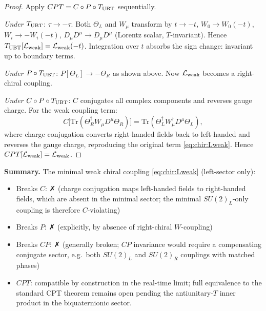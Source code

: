 \documentclass[12pt,a4paper]{article}
\theoremstyle{definition}
\theoremstyle{remark}
\begin{document}
\begin{proof}
Apply $CPT = C \circ P \circ T_{\rm UBT}$ sequentially.

\medskip
\noindent\textit{Under $T_{\rm UBT}$}: $\tau\to-\tau$.
Both $\Theta_L$ and $W_\mu$ transform by $t\to-t$,
$W_0\to W_0(-t)$, $W_i\to -W_i(-t)$, $D_\mu D^\mu \to D_\mu D^\mu$
(Lorentz scalar, $T$-invariant).
Hence $T_{\rm UBT}[\mathcal{L}_{\rm weak}] = \mathcal{L}_{\rm weak}(-t)$.
Integration over $t$ absorbs the sign change: invariant up to boundary terms.

\medskip
\noindent\textit{Under $P \circ T_{\rm UBT}$}: $P[\Theta_L]\to -\Theta_R$ as shown
above.  Now $\mathcal{L}_{\rm weak}$ becomes a right-chiral coupling.

\medskip
\noindent\textit{Under $C \circ P \circ T_{\rm UBT}$}:
$C$ conjugates all complex components and reverses gauge charge.
For the weak coupling term:
\begin{equation}
  C\bigl[\mathrm{Tr}(\Theta_R^\dagger W_\mu D^\mu\Theta_R)\bigr]
  = \mathrm{Tr}(\Theta_L^\dagger W_\mu^\dagger D^\mu \Theta_L),
\end{equation}
where charge conjugation converts right-handed fields back to left-handed and
reverses the gauge charge, reproducing the original term \eqref{eq:chir:Lweak}.
Hence $CPT[\mathcal{L}_{\rm weak}] = \mathcal{L}_{\rm weak}$. \checkmark
\end{proof}

\begin{resultbox}
\textbf{Summary.}
The minimal weak chiral coupling \eqref{eq:chir:Lweak} (left-sector only):
\begin{itemize}
  \item Breaks $C$: ✗ (charge conjugation maps left-handed fields to
    right-handed fields, which are absent in the minimal sector; the
    minimal $SU(2)_L$-only coupling is therefore $C$-violating)
  \item Breaks $P$: ✗ (explicitly, by absence of right-chiral $W$-coupling)
  \item Breaks $CP$: ✗ (generally broken; $CP$ invariance would require a
    compensating conjugate sector, e.g.\ both $SU(2)_L$ and $SU(2)_R$
    couplings with matched phases)
  \item $CPT$: compatible by construction in the real-time limit; full
    equivalence to the standard CPT theorem remains open pending the
    antiunitary-$T$ inner product in the biquaternionic sector.
\end{itemize}
\end{resultbox}
\end{document}
